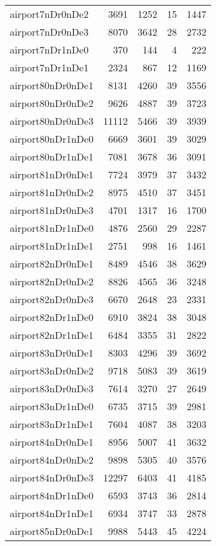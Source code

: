 \documentclass[../../../thesis.tex]{subfiles}
\begin{document}
\begin{longtable}{lrrrr}
airport7nDr0nDe2 & 3691 & 1252 & 15 & 1447 \\
airport7nDr0nDe3 & 8070 & 3642 & 28 & 2732 \\
airport7nDr1nDe0 & 370 & 144 & 4 & 222 \\
airport7nDr1nDe1 & 2324 & 867 & 12 & 1169 \\
airport80nDr0nDe1 & 8131 & 4260 & 39 & 3556 \\
airport80nDr0nDe2 & 9626 & 4887 & 39 & 3723 \\
airport80nDr0nDe3 & 11112 & 5466 & 39 & 3939 \\
airport80nDr1nDe0 & 6669 & 3601 & 39 & 3029 \\
airport80nDr1nDe1 & 7081 & 3678 & 36 & 3091 \\
airport81nDr0nDe1 & 7724 & 3979 & 37 & 3432 \\
airport81nDr0nDe2 & 8975 & 4510 & 37 & 3451 \\
airport81nDr0nDe3 & 4701 & 1317 & 16 & 1700 \\
airport81nDr1nDe0 & 4876 & 2560 & 29 & 2287 \\
airport81nDr1nDe1 & 2751 & 998 & 16 & 1461 \\
airport82nDr0nDe1 & 8489 & 4546 & 38 & 3629 \\
airport82nDr0nDe2 & 8826 & 4565 & 36 & 3248 \\
airport82nDr0nDe3 & 6670 & 2648 & 23 & 2331 \\
airport82nDr1nDe0 & 6910 & 3824 & 38 & 3048 \\
airport82nDr1nDe1 & 6484 & 3355 & 31 & 2822 \\
airport83nDr0nDe1 & 8303 & 4296 & 39 & 3692 \\
airport83nDr0nDe2 & 9718 & 5083 & 39 & 3619 \\
airport83nDr0nDe3 & 7614 & 3270 & 27 & 2649 \\
airport83nDr1nDe0 & 6735 & 3715 & 39 & 2981 \\
airport83nDr1nDe1 & 7604 & 4087 & 38 & 3203 \\
airport84nDr0nDe1 & 8956 & 5007 & 41 & 3632 \\
airport84nDr0nDe2 & 9898 & 5305 & 40 & 3576 \\
airport84nDr0nDe3 & 12297 & 6403 & 41 & 4185 \\
airport84nDr1nDe0 & 6593 & 3743 & 36 & 2814 \\
airport84nDr1nDe1 & 6934 & 3747 & 33 & 2878 \\
airport85nDr0nDe1 & 9988 & 5443 & 45 & 4224 \\

\end{longtable}
\end{document}
